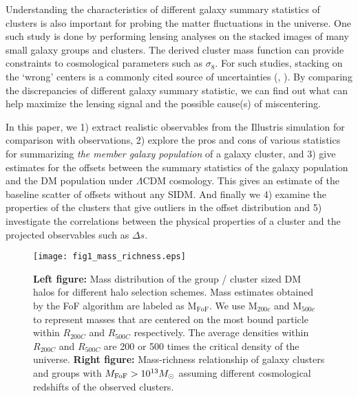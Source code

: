 Understanding the characteristics of different galaxy
summary statistics of clusters is also important for  
probing the matter fluctuations in the universe. 
One such study is done by performing lensing analyses on the stacked images of 
many small galaxy groups and clusters. 
The derived cluster mass function can provide constraints to cosmological
parameters such as $\sigma_8$. 
For such studies, stacking on the `wrong' centers is a commonly cited
source of uncertainties (\citealt{Johnston2007b},
\citealt{Ford2014}). By comparing the discrepancies of different galaxy
summary statistic, we can find out what can help maximize the lensing signal and 
the possible cause(s) of miscentering. 

In this paper, we 
1) extract realistic observables from the Illustris simulation for
comparison with observations, 2) explore the pros and cons of various statistics for 
summarizing {\it the member galaxy population} of a galaxy cluster, and 3)	
give estimates for the offsets between the summary statistics of the galaxy  
population and the DM population under $\Lambda$CDM cosmology.
This gives
an estimate of the baseline scatter of offsets without any SIDM. And finally we 
4) examine the properties of the clusters that give outliers in 
the offset distribution and 5) investigate the  
correlations between the physical properties of a cluster and the projected 
observables such as $\Delta s$. 
\begin{figure*}
	\texttt{[image: fig1\_mass\_richness.eps]}
	\caption{ {\bf Left figure:} Mass distribution of the group / cluster sized 
		DM halos for different halo selection schemes. Mass estimates obtained by the
		FoF algorithm are labeled as  M$_{\text{FoF}}$.
		We use M$_{200c}$ and M$_{500c}$ to represent 
		masses that are centered on the most bound particle within $R_{200C}$ and
		$R_{500C}$ respectively. The  
		average densities within $R_{200C}$ and $R_{500C}$ are 
		200 or 500 times the critical density of the universe. 
		{\bf Right figure:} 
		Mass-richness relationship of galaxy clusters and groups with 
		$M_{\rm FoF} > 10^{13} M_{\odot}$ assuming different cosmological redshifts
		of the observed clusters. 
\label{fig:mass_richness}}
\end{figure*}

